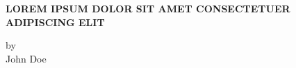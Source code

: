\thispagestyle{empty}

\begin{center}

{\large \MakeUppercase{\textbf{Lorem ipsum dolor sit amet consectetuer adipiscing elit}}}

\vspace{1in}

by \\
John Doe 


\end{center}
